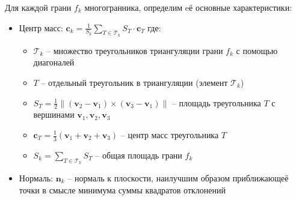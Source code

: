 \documentclass[a4paper,14pt]{extarticle}
\theoremstyle{remark} %
\begin{document}
Для каждой грани $f_k$ многогранника, определим eё основные характеристики:
\begin{itemize}
    \item Центр масс: $\mathbf{c}_k = \frac{1}{S_k} \sum\limits_{T \in \mathcal{T}_k} S_T \cdot \mathbf{c}_T$
    \noindent где:
    \begin{itemize}
        \item $\mathcal{T}_k$ -- множество треугольников триангуляции грани $f_k$ с помощью диагоналей
        \item $T$ -- отдельный треугольник в триангуляции (элемент $\mathcal{T}_k$)
        \item $S_T = \frac{1}{2}\|(\mathbf{v}_2 - \mathbf{v}_1) \times (\mathbf{v}_3 - \mathbf{v}_1)\|$ -- площадь треугольника $T$ 
            с вершинами $\mathbf{v}_1, \mathbf{v}_2, \mathbf{v}_3$
        \item $\mathbf{c}_T = \frac{1}{3}(\mathbf{v}_1 + \mathbf{v}_2 + \mathbf{v}_3)$ -- центр масс треугольника $T$
        \item $S_k = \sum_{T \in \mathcal{T}_k} S_T$ -- общая площадь грани $f_k$
    \end{itemize}
    \item Нормаль: $\mathbf{n}_k$ -- нормаль к плоскости, наилучшим образом приближающеё точки в смысле минимума суммы квадратов отклонений
\end{itemize}
\end{document}
